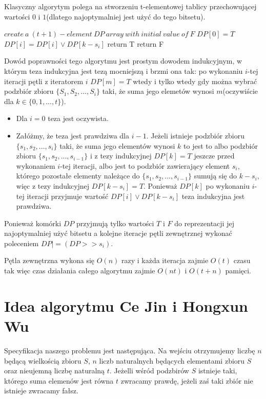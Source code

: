 \documentclass{article}
\begin{document}
Klasyczny algorytym polega na stworzeniu t-elementowej tablicy przechowującej wartości 
$0$ i $1$(dlatego najoptymalniej jest użyć do tego bitsetu). 

\begin{algorithm}
\caption{}
\begin{algorithmic}
    \STATE $create\ a\ (t+1)-element\ DP\ array\ with\ initial\ value\ of\ F$
    \STATE $DP[0] = T$
    \STATE $DP[i] = DP[i] \lor DP[k-s_i] $
    \ENDFOR
    \STATE return T
    \ENDIF
    \ENDFOR
    \STATE return F
\end{algorithmic}
\end{algorithm}

Dowód poprawności tego algorytmu jest prostym dowodem indukcyjnym, w którym teza indukcyjna
jest tezą mocniejszą i brzmi ona tak: po wykonaniu $i$-tej iteracji pętli z iteratorem $i$ $DP[m]=T$ 
wtedy i tylko wtedy
gdy można wybrać podzbiór zbioru $\{S_1,S_2,...,S_i\}$ taki, że suma jego elemetów wynosi 
$m$(oczywiście dla $k \in \{0,1,...,t\}$). 
\begin{itemize}
    \item Dla $i = 0$ teza jest oczywista.
    \item Załóżmy, że teza jest prawdziwa dla $i-1$. Jeżeli istnieje podzbiór
    zbioru $\{s_1,s_2,...,s_i\}$ taki, że suma jego elementów wynosi $k$ to jest to 
    albo podzbiór zbioru $\{s_1,s_2,...,s_{i-1}\}$ i z tezy indukcyjnej $DP[k]=T$
    jeszcze przed wykonaniem $i$-tej iteracji, albo jest to podzbiór zawierający element
    $s_i$, którego pozostałe elementy należące do $\{s_1,s_2,...,s_{i-1}\}$ sumują się 
    do $k-s_i$, więc z tezy indukcyjnej $DP[k-s_i] = T$. Ponieważ $DP[k]$ po wykonaniu $i$-tej iteracji
    przyjmuje wartość $DP[i] \lor DP[k-s_i] $ teza indukcyjna jest prawdziwa.
  \end{itemize}
Ponieważ komórki $DP$ przyjmują tylko wartości $T$ i $F$ do reprezentacji jej najoptymalniej
użyć bitsetu a kolejne iteracje pętli zewnętrznej wykonać poleceniem $DP |= (DP >> s_i)$.

Pętla zewnętrzna wykona się $O(n)$ razy i każda iteracja zajmie $O(t)$ czasu tak więc
czas działania całego algorytmu zajmie $O(nt)$ i $O(t+n)$ pamięci.
\section{Idea algorytmu Ce Jin i Hongxun Wu}

Specyfikacja naszego problemu jest następująca. Na wejściu otrzymujemy liczbę $n$ będącą wielkością
zbioru $S$, $n$ liczb naturalnych będących elementami zbioru $S$ oraz nieujemną liczbę naturalną
$t$. Jeżelli wśród podzbirów $S$ istnieje taki, którego suma elemenów jest równa $t$ zwracamy 
prawdę, jeżeli zaś taki zbiór nie istnieje zwracamy fałsz.
\end{document}
